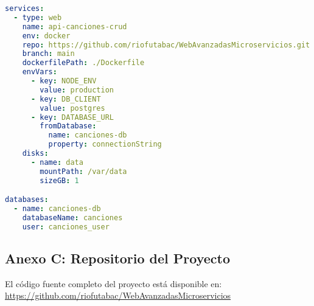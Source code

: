 \documentclass[12pt,a4paper]{article}
\begin{document}
\begin{lstlisting}[language=yaml, caption=Archivo render.yaml completo]
services:
  - type: web
    name: api-canciones-crud
    env: docker
    repo: https://github.com/riofutabac/WebAvanzadasMicroservicios.git
    branch: main
    dockerfilePath: ./Dockerfile
    envVars:
      - key: NODE_ENV
        value: production
      - key: DB_CLIENT
        value: postgres
      - key: DATABASE_URL
        fromDatabase:
          name: canciones-db
          property: connectionString
    disks:
      - name: data
        mountPath: /var/data
        sizeGB: 1

databases:
  - name: canciones-db
    databaseName: canciones
    user: canciones_user
\end{lstlisting}

\subsection{Anexo C: Repositorio del Proyecto}

El código fuente completo del proyecto está disponible en:
\url{https://github.com/riofutabac/WebAvanzadasMicroservicios}
\end{document}
